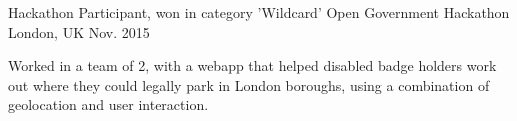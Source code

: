 

\begin{cventries}

  \cventry
    {Hackathon Participant, won in category 'Wildcard'} %
    {Open Government Hackathon} %
    {London, UK} %
    {Nov. 2015} %
    {
      \begin{cvitems} %
          \item {Worked in a team of 2, with a webapp that helped disabled badge holders work out where they could legally park in London boroughs, using a combination of geolocation and user interaction.}
      \end{cvitems}
    }

\end{cventries}
